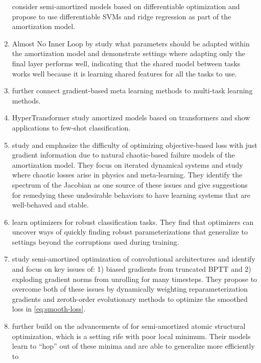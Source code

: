 \documentclass[twoside,11pt]{article}
\begin{document}
\begin{enumerate}
  consider semi-amortized models based on differentiable
  optimization and propose to use differentiable SVMs
  and ridge regression as part of the amortization model.
\item Almost No Inner Loop by \citet{raghu2019rapid}
  study what parameters should be adapted within the amortization
  model and demonstrate settings where adapting only
  the final layer performs well, indicating that the shared model
  between tasks works well because it is learning
  shared features for all the tasks to use.
\item \citet{wang2021bridging} further connect gradient-based meta
  learning methods to multi-task learning methods.
\item HyperTransformer \citep{zhmoginov2022hypertransformer}
  study amortized models based on transformers
  \citep{vaswani2017attention}
  and show applications to few-shot classification.
\item \citet{metz2021gradients} study and emphasize the difficulty
  of optimizing objective-based loss with just gradient
  information due to natural chaotic-based failure models
  of the amortization model.
  They focus on iterated dynamical systems and study where
  chaotic losses arise in physics and meta-learning.
  They identify the spectrum of the Jacobian as one
  source of these issues and give suggestions for
  remedying these undesirable behaviors to have learning
  systems that are well-behaved and stable.
\item \citet{metz2019using} learn optimizers for robust
  classification tasks. They find that optimizers can
  uncover ways of quickly finding robust parameterizations
  that generalize to settings beyond the corruptions
  used during training.
\item \citet{metz2019understanding} study semi-amortized
  optimization of convolutional architectures and identify
  and focus on key issues of:
  1) biased gradients from truncated BPTT and 2) exploding gradient
  norms from unrolling for many timesteps.
  They propose to overcome both of these issues by
  dynamically weighting reparameterization
  gradients and zeroth-order evolutionary methods to
  optimize the smoothed loss in \cref{eq:smooth-loss}.
\item \citet{merchant2021learn2hop} further build on
  the advancements of \citet{metz2019understanding} for
  semi-amortized atomic structural optimization, which
  is a setting rife with poor local minimum.
  Their models learn to ``hop'' out of these minima
  and are able to generalize more efficiently to

\end{enumerate}
\end{document}

